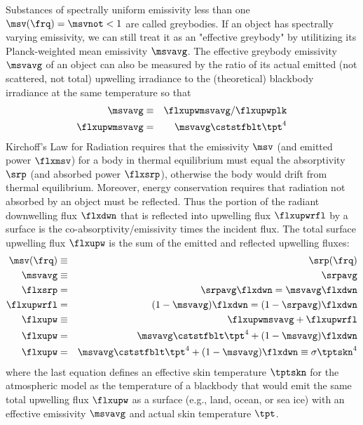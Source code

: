 \documentclass[12pt]{article}
\begin{document}
Substances of spectrally uniform emissivity less than one $\msv(\frq) = \msvnot  < 1$ are called greybodies.
If an object has spectrally varying emissivity, we can still treat it as an "effective greybody" by utilitizing its Planck-weighted mean emissivity $\msvavg$. 
The effective greybody emissivity $\msvavg$ of an object can also be measured by the ratio of its actual emitted (not scattered, not total) upwelling irradiance to the (theoretical) blackbody irradiance at the same temperature so that
\begin{eqnarray}
\msvavg & \equiv & \flxupwmsvavg/\flxupwplk \nonumber \\
\flxupwmsvavg & = & \msvavg \cststfblt \tpt^{4}
\label{eqn:msv_not_dfn}
\end{eqnarray}
Kirchoff's Law for Radiation requires that the emissivity $\msv$ (and emitted power $\flxmsv$) for a body in thermal equilibrium must equal the absorptivity $\srp$ (and absorbed power $\flxsrp$), otherwise the body would drift from thermal equilibrium. 
Moreover, energy conservation requires that radiation not absorbed by an object must be reflected.
Thus the portion of the radiant downwelling flux $\flxdwn$ that is reflected into upwelling flux $\flxupwrfl$ by a surface is the co-absorptivity/emissivity times the incident flux. 
The total surface upwelling flux $\flxupw$ is the sum of the emitted and reflected upwelling fluxes:
\begin{eqnarray}
\msv(\frq) & \equiv & \srp(\frq) \nonumber \\
\msvavg & \equiv & \srpavg \nonumber \\
\flxsrp & = & \srpavg \flxdwn = \msvavg \flxdwn \nonumber \\
\flxupwrfl & = & (1- \msvavg) \flxdwn = (1 - \srpavg) \flxdwn \nonumber \\
\flxupw & \equiv & \flxupwmsvavg + \flxupwrfl \nonumber \\
\flxupw & = & \msvavg \cststfblt \tpt^{4} +  (1- \msvavg) \flxdwn \nonumber \\
\flxupw & = & \msvavg \cststfblt \tpt^{4} +  (1- \msvavg) \flxdwn \equiv \sigma \tptskn^{4}
\label{eqn:flx_upw_dfn}
\end{eqnarray}
where the last equation defines an effective skin temperature $\tptskn$ for the atmospheric model as the temperature of a blackbody that would emit the same total upwelling flux $\flxupw$ as a surface (e.g., land, ocean, or sea ice) with an effective emissivity $\msvavg$ and actual skin temperature $\tpt$. 
\end{document}
